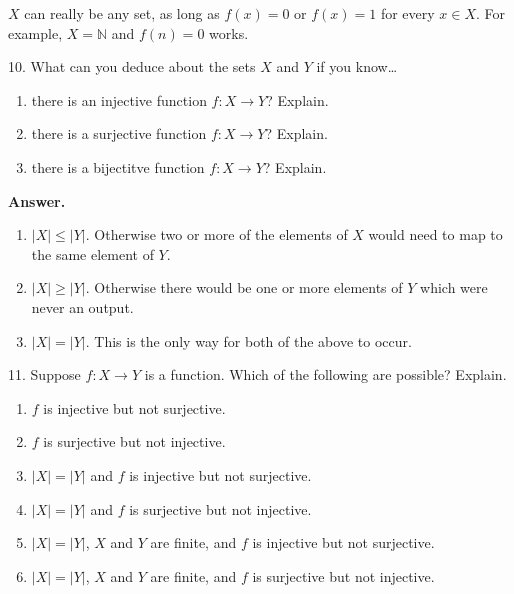 \documentclass[10pt,]{book}
\theoremstyle{plain}
\theoremstyle{definition}
\theoremstyle{definition}
\theoremstyle{definition}
\numberwithin{equation}{section}
\def\N{\mathbb N}
\begin{document}
\begin{exerciselist}
\(X\) can really be any set, as long as \(f(x) = 0\) or \(f(x) = 1\) for every \(x \in X\). For example, \(X = \N\) and \(f(n) = 0\) works.
%
\item[10.]\hypertarget{exercise-26}{}
What can you deduce about the sets \(X\) and \(Y\) if you know\dots{}
%
\leavevmode%
\begin{enumerate}[label=(\alph*)]
\item\hypertarget{li-229}{}
there is an injective function \(f:X \to Y\)?  Explain.
%
\item\hypertarget{li-230}{}
there is a surjective function \(f:X \to Y\)?  Explain.
%
\item\hypertarget{li-231}{}
there is a bijectitve function \(f:X \to Y\)?  Explain.
%
\end{enumerate}
\par\smallskip
\par\smallskip
\noindent\textbf{Answer.}\hypertarget{answer-26}{}\quad
\leavevmode%
\begin{enumerate}[label=(\alph*)]
\item\hypertarget{li-232}{}\(|X| \le |Y|\). Otherwise two or more of the elements of \(X\) would need to map to the same element of \(Y\).\item\hypertarget{li-233}{}\(|X| \ge |Y|\). Otherwise there would be one or more elements of \(Y\) which were never an output.\item\hypertarget{li-234}{}\(|X| = |Y|\).  This is the only way for both of the above to occur.\end{enumerate}
\item[11.]\hypertarget{exercise-27}{}
Suppose \(f:X \to Y\) is a function. Which of the following are possible? Explain.
%
\leavevmode%
\begin{enumerate}[label=(\alph*)]
\item\hypertarget{li-235}{}\(f\) is injective but not surjective.\item\hypertarget{li-236}{}\(f\) is surjective but not injective.\item\hypertarget{li-237}{}\(|X| = |Y|\) and \(f\) is injective but not surjective.\item\hypertarget{li-238}{}\(|X| = |Y|\) and \(f\) is surjective but not injective.\item\hypertarget{li-239}{}\(|X| = |Y|\), \(X\) and \(Y\) are finite, and \(f\) is injective but not surjective.\item\hypertarget{li-240}{}\(|X| = |Y|\), \(X\) and \(Y\) are finite, and \(f\) is surjective but not injective.\end{enumerate}

\end{exerciselist}
\end{document}
